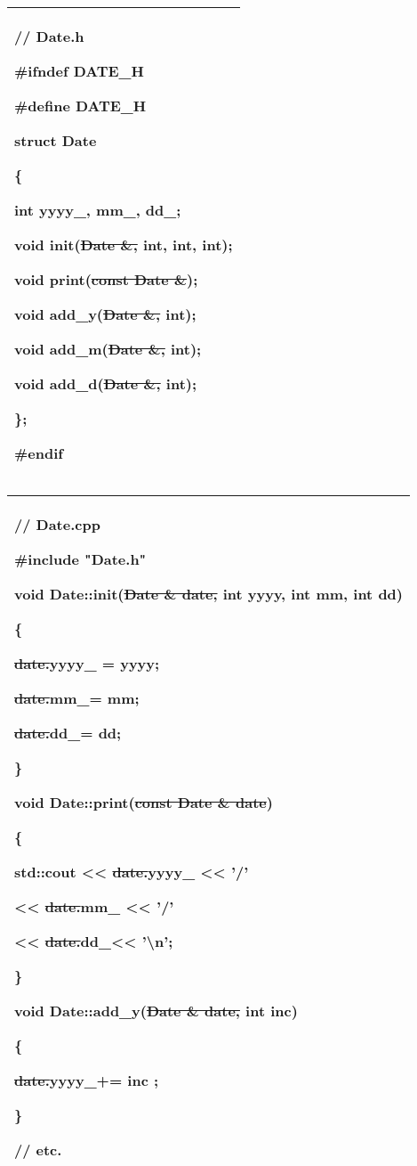 \documentclass[
]{article}
\begin{document}
\begin{longtable}[]{@{}l@{}}
\toprule
\endhead
\begin{minipage}[t]{0.97\columnwidth}\raggedright
// Date.h

\#ifndef DATE\_H

\#define DATE\_H

struct Date

\{

int yyyy\_, mm\_, dd\_;

void init(\sout{Date \&,} int, int, int);

void print(\sout{const Date \&});

void add\_y(\sout{Date \&,} int);

void add\_m(\sout{Date \&,} int);

void add\_d(\sout{Date \&,} int);

\};

\#endif\strut
\end{minipage}\tabularnewline
\bottomrule
\end{longtable}

\begin{longtable}[]{@{}l@{}}
\toprule
\endhead
\begin{minipage}[t]{0.97\columnwidth}\raggedright
// Date.cpp

\#include "Date.h"

void \textbf{Date::}init(\sout{Date \& date,} int yyyy, int mm, int dd)

\{

\sout{date.}yyyy\_ = yyyy;

\sout{date.}mm\_= mm;

\sout{date.}dd\_= dd;

\}

void \textbf{Date::}print(\sout{const Date \& date})

\{

std::cout \textless\textless{} \sout{date.}yyyy\_ \textless\textless{}
'/'

\textless\textless{} \sout{date.}mm\_ \textless\textless{} '/'

\textless\textless{} \sout{date.}dd\_\textless\textless{}
'\textbackslash n';

\}

void \textbf{Date::}add\_y(\sout{Date \& date,} int inc)

\{

\sout{date.}yyyy\_+= inc ;

\}

// etc.\strut
\end{minipage}\tabularnewline
\bottomrule
\end{longtable}
\end{document}
